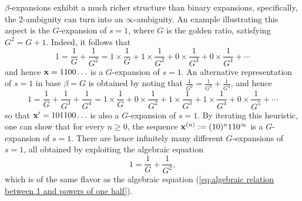 $\beta$-expansions exhibit a much richer structure than binary expansions, specifically,  the 2-ambiguity can turn into an $\infty$-ambiguity. An example illustrating this aspect is the $G$-expansion of $s=1$, where $G$ is the golden ratio, satisfying $G^2 = G + 1$. Indeed, it follows that
  \begin{equation}
      1 = \frac{1}{G} + \frac{1}{G^2} = 1 \times \frac{1}{G} + 1 \times \frac{1}{G^2} + 0 \times \frac{1}{G^3} + 0 \times \frac{1}{G^4} + \cdots
  \end{equation}
 and hence ${\bf x} = 1100\ldots$ is a $G$-expansion of $s=1$. An alternative representation of $s=1$ in base $\beta=G$ is obtained by noting that $\frac{1}{G^2} = \frac{1}{G^3} + \frac{1}{G^4}$, and hence
  \begin{equation}
      1 = \frac{1}{G} + \frac{1}{G^3} + \frac{1}{G^4} = 1 \times \frac{1}{G} + 0 \times \frac{1}{G^2} + 1 \times \frac{1}{G^3} + 1 \times \frac{1}{G^4} + 0 \times \frac{1}{G^5} + \cdots
  \end{equation}
  so that ${\bf x}'=101100\ldots$ is also a $G$-expansion of $s=1$. By iterating this heuristic, one can show that for every $n \geq 0$, the sequence ${\bf x}^{(n)} := (10)^{n}110^\infty$ is a $G$-expansion of $s=1$. There are hence infinitely many different $G$-expansions of $s=1$, all obtained by exploiting the algebraic equation
  \begin{equation}
	1 = \frac{1}{G} + \frac{1}{G^2},
  \end{equation}
  which is of the same flavor as the algebraic equation (\ref{eq:algebraic relation between 1 and powers of one half}).

